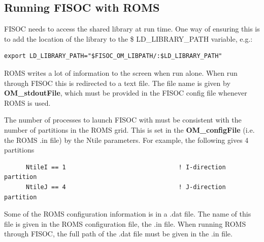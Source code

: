 \documentclass[11pt]{article}
\begin{document}
\subsection{Running FISOC with ROMS}
\label{sec:runningROMS}

FISOC needs to access the shared library at run time.  One way of ensuring this 
is to add the location of the library to the \$ LD\_LIBRARY\_PATH variable, e.g.:
\begin{lstlisting}
export LD_LIBRARY_PATH="$FISOC_OM_LIBPATH/:$LD_LIBRARY_PATH"
\end{lstlisting}

ROMS writes a lot of information to the screen when run alone.  
When run through FISOC this is redirected to a text file. 
The file name is given by \textbf{OM\_stdoutFile}, 
which must be provided in the FISOC config file 
whenever ROMS is used.

The number of processes to launch FISOC with must be consistent with the number of 
partitions in the ROMS grid.  This is set in the \textbf{OM\_configFile} (i.e. the ROMS .in file) by the 
Ntile parameters.  For example, the following gives 4 partitions
\begin{lstlisting}
      NtileI == 1                               ! I-direction partition
      NtileJ == 4                               ! J-direction partition
\end{lstlisting}

Some of the ROMS configuration information is in a .dat file.
The name of this file is given in the ROMS configuration file, the .in file.
When running ROMS through FISOC, the full path of the .dat file must be 
given in the .in file.
\end{document}
